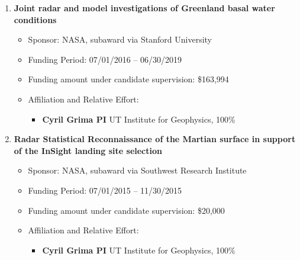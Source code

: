 \begin{enumerate}[leftmargin=2.5em, labelsep=1.5em, label=E\arabic*]
    \item
        \textbf{Joint radar and model investigations of Greenland basal water conditions}
        \begin{itemize}[leftmargin=0em, labelsep=1em, topsep=-.5em, itemsep=-.2em]
            \item Sponsor: NASA, subaward via Stanford University
            \item Funding Period: 07/01/2016 – 06/30/2019
            \item Funding amount under candidate supervision: \$163,994
            \item Affiliation and Relative Effort:
            \TabPositions{4cm, 5.5cm}
            \begin{itemize}[leftmargin=2em, labelsep=1em, topsep=-.5em, itemsep=-.2em]
                \item \textbf{Cyril Grima \tab PI} \tab  UT Institute for Geophysics, 100\%
            \end{itemize}
        \end{itemize}

    \item
        \textbf{Radar Statistical Reconnaissance of the Martian surface in support of the InSight landing site selection}
        \begin{itemize}[leftmargin=0em, labelsep=1em, topsep=-.5em, itemsep=-.2em]
            \item Sponsor: NASA, subaward via Southwest Research Institute
            \item Funding Period: 07/01/2015 – 11/30/2015
            \item Funding amount under candidate supervision: \$20,000
            \item Affiliation and Relative Effort:
            \TabPositions{4cm, 5.5cm}
            \begin{itemize}[leftmargin=2em, labelsep=1em, topsep=-.5em, itemsep=-.2em]
                \item \textbf{Cyril Grima \tab PI} \tab  UT Institute for Geophysics, 100\%
            \end{itemize}
        \end{itemize}


\end{enumerate}
